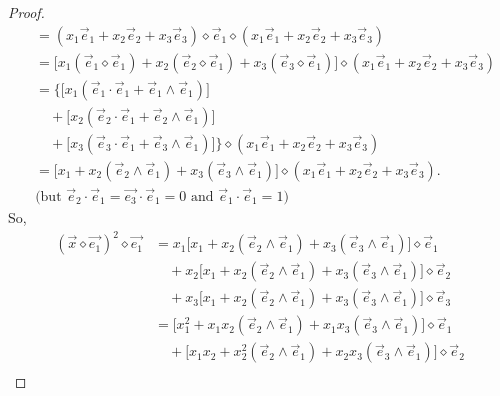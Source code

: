 \documentclass[10pt,a4paper]{amsart}
\begin{document}
\begin{proof}
\begin{align*}
&= \left(
x_{1}\vec{e}_{1} + x_{2}\vec{e}_{2} + x_{3}\vec{e}_{3}
\right)
\diamond \vec{e}_{1}
\diamond
\left(
x_{1}\vec{e}_{1} + x_{2}\vec{e}_{2} + x_{3}\vec{e}_{3}
\right) \\[6pt]
&= \Big[
x_{1}\left( \vec{e}_{1}\diamond \vec{e}_{1} \right)
+ x_{2}\left( \vec{e}_{2}\diamond \vec{e}_{1} \right)
+ x_{3}\left( \vec{e}_{3}\diamond \vec{e}_{1} \right)
\Big]
\diamond
\left(
x_{1}\vec{e}_{1} + x_{2}\vec{e}_{2} + x_{3}\vec{e}_{3}
\right) \\[6pt]
&= \Bigg\{ \Big[
x_{1}\left( \vec{e}_{1}\cdot \vec{e}_{1} + \vec{e}_{1}\wedge \vec{e}_{1} \right)
\Big] \\
&\quad + \Big[
x_{2}\left( \vec{e}_{2}\cdot \vec{e}_{1} + \vec{e}_{2}\wedge \vec{e}_{1} \right)
\Big] \\
&\quad + \Big[
x_{3}\left( \vec{e}_{3}\cdot \vec{e}_{1} + \vec{e}_{3}\wedge \vec{e}_{1} \right)
\Big]
\Bigg \}
\diamond
\left(
x_{1}\vec{e}_{1} + x_{2}\vec{e}_{2} + x_{3}\vec{e}_{3}
\right) \\[6pt]
&= \Big[
x_{1}
+ x_{2}\left( \vec{e}_{2}\wedge \vec{e}_{1} \right)
+ x_{3}\left( \vec{e}_{3}\wedge \vec{e}_{1} \right)
\Big]
\diamond
\left(
x_{1}\vec{e}_{1} + x_{2}\vec{e}_{2} + x_{3}\vec{e}_{3}
\right). \\[4pt]
&\text{(but $\vec{e}_{2}\cdot \vec{e}_{1}=\vec{e_{3}}\cdot \vec{e}_{1}=0$ and $\vec{e}_{1}\cdot \vec{e}_{1}=1$) }
\end{align*}
So,
\begin{align*}
\left(\vec{x}\diamond\vec{e_1}\right)^2\diamond\vec{e_1}&= x_{1}\Big[
x_{1}+x_{2}\left( \vec{e}_{2}\wedge \vec{e}_{1} \right)
+ x_{3}\left( \vec{e}_{3}\wedge \vec{e}_{1} \right)
\Big]\diamond \vec{e}_{1} \\[4pt]
&\quad + x_{2}\Big[
x_{1}+x_{2}\left( \vec{e}_{2}\wedge \vec{e}_{1} \right)
+ x_{3}\left( \vec{e}_{3}\wedge \vec{e}_{1} \right)
\Big]\diamond \vec{e}_{2} \\[4pt]
&\quad + x_{3}\Big[
x_{1}+x_{2}\left( \vec{e}_{2}\wedge \vec{e}_{1} \right)
+ x_{3}\left( \vec{e}_{3}\wedge \vec{e}_{1} \right)
\Big]\diamond \vec{e}_{3} \\[8pt]
&= \Big[
x_{1}^{2}
+ x_{1}x_{2}\left( \vec{e}_{2}\wedge \vec{e}_{1} \right)
+ x_{1}x_{3}\left( \vec{e}_{3}\wedge \vec{e}_{1} \right)
\Big]\diamond \vec{e}_{1} \\[4pt]
&\quad + \Big[
x_{1}x_{2}
+ x_{2}^{2}\left( \vec{e}_{2}\wedge \vec{e}_{1} \right)
+ x_{2}x_{3}\left( \vec{e}_{3}\wedge \vec{e}_{1} \right)
\Big]\diamond \vec{e}_{2} \\[4pt]

\end{align*}
\end{proof}
\end{document}
